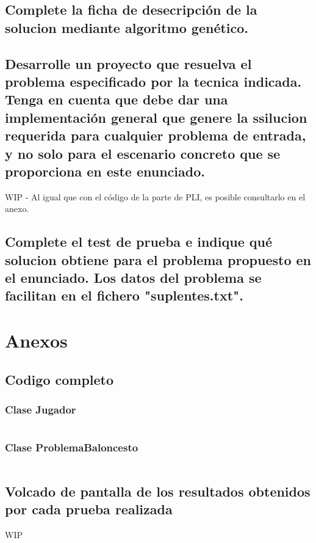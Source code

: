 \documentclass[a4paper,12pt]{article}
\begin{document}
\subsection{Complete la ficha de desecripción de la solucion mediante algoritmo genético.}

\subsection{Desarrolle un proyecto que resuelva el problema especificado por la tecnica indicada. Tenga en cuenta que debe dar una implementación general que genere la ssilucion requerida para cualquier problema de entrada, y no solo para el escenario concreto que se proporciona en este enunciado.}
WIP - Al igual que con el código de la parte de PLI, es posible consultarlo en el anexo.
\subsection{Complete el test de prueba e indique qué solucion obtiene para el problema propuesto en el enunciado. Los datos del problema se facilitan en el fichero "suplentes.txt".}

\section{Anexos}
\subsection{Codigo completo}

\subsubsection{Clase Jugador}
\inputminted[fontsize=\footnotesize,breaklines]{java}{src/code/Jugador.java}

\subsubsection{Clase ProblemaBaloncesto}
\inputminted[fontsize=\footnotesize,breaklines]{java}{src/code/ProblemaBaloncesto.java}


\subsection{Volcado de pantalla de los resultados obtenidos por cada prueba realizada}
WIP
\end{document}
